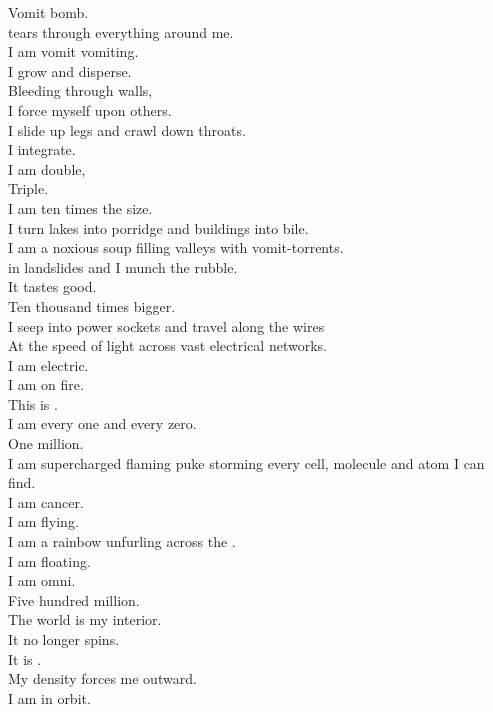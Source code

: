 Vomit bomb. \\
 tears through everything around me. \\
I am vomit vomiting. \\
I grow and disperse. \\

Bleeding through walls, \\
I force myself upon others. \\
I slide up legs and crawl down throats. \\
I integrate. \\
I am double, \\
Triple. \\
I am ten times the size. \\

I turn lakes into porridge and buildings into bile. \\
I am a noxious soup filling valleys with vomit-torrents. \\
 in landslides and I munch the rubble. \\
It tastes good. \\

Ten thousand times bigger. \\
I seep into power sockets and travel along the wires \\
At the speed of light across vast electrical networks. \\
I am electric. \\
I am on fire. \\
This is . \\
I am every one and every zero. \\

One million. \\
I am supercharged flaming puke storming every cell, molecule and atom I can find. \\
I am cancer. \\
I am flying. \\
I am a rainbow unfurling across the . \\
I am floating. \\
I am omni. \\

Five hundred million. \\
The world is my interior. \\
It no longer spins. \\
It is . \\
My density forces me outward. \\
I am in orbit. \\

